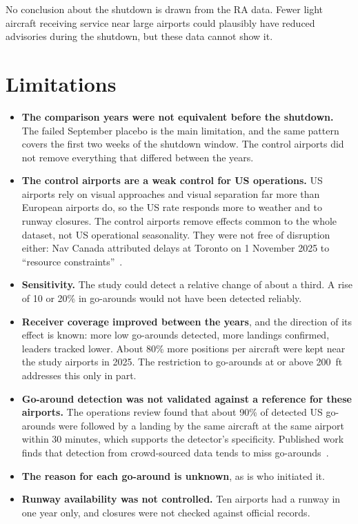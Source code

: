 \documentclass[11pt]{article}
\begin{document}
No conclusion about the shutdown is drawn from the RA data. Fewer light aircraft receiving service near large airports could plausibly have reduced advisories during the shutdown, but these data cannot show it.

\section{Limitations}\label{sec:limits}

\begin{itemize}
\item \textbf{The comparison years were not equivalent before the shutdown.} The failed September placebo is the main limitation, and the same pattern covers the first two weeks of the shutdown window. The control airports did not remove everything that differed between the years.
\item \textbf{The control airports are a weak control for US operations.} US airports rely on visual approaches and visual separation far more than European airports do, so the US rate responds more to weather and to runway closures. The control airports remove effects common to the whole dataset, not US operational seasonality. They were not free of disruption either: Nav Canada attributed delays at Toronto on 1 November 2025 to ``resource constraints''~\cite{cp2025pearson}.
\item \textbf{Sensitivity.} The study could detect a relative change of about a third. A rise of 10 or 20\% in go-arounds would not have been detected reliably.
\item \textbf{Receiver coverage improved between the years}, and the direction of its effect is known: more low go-arounds detected, more landings confirmed, leaders tracked lower. About 80\% more positions per aircraft were kept near the study airports in 2025. The restriction to go-arounds at or above 200~ft addresses this only in part.
\item \textbf{Go-around detection was not validated against a reference for these airports.} The operations review found that about 90\% of detected US go-arounds were followed by a landing by the same aircraft at the same airport within 30 minutes, which supports the detector's specificity. Published work finds that detection from crowd-sourced data tends to miss go-arounds~\cite{monstein2022}.
\item \textbf{The reason for each go-around is unknown}, as is who initiated it.
\item \textbf{Runway availability was not controlled.} Ten airports had a runway in one year only, and closures were not checked against official records.

\end{itemize}
\end{document}
